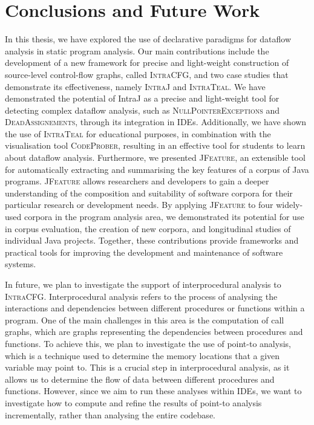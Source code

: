 \section{Conclusions and Future Work}%
\label{sec:kappa:conclusions}%
In this thesis, we have explored the use of declarative paradigms for
dataflow analysis in static program analysis. Our main contributions include the
development of a new framework for precise and light-weight construction of source-level
control-flow graphs, called \textsc{IntraCFG}, and two case studies that demonstrate
its effectiveness, namely \textsc{IntraJ} and \textsc{IntraTeal}.
We have demonstrated the potential of IntraJ as a precise and light-weight tool
for detecting complex dataflow analysis, such as \textsc{NullPointerExceptions} and \textsc{DeadAssignements},
through its integration in IDEs. Additionally, we have shown the use of \textsc{IntraTeal}
for educational purposes, in combination with the visualisation tool \textsc{CodeProber},
resulting in an effective tool for students to learn about dataflow analysis.
Furthermore, we presented  \textsc{JFeature}, an extensible tool for automatically
extracting and summarising the key features of a corpus of Java programs.
\textsc{JFeature} allows researchers and developers to gain a deeper understanding of the composition and
suitability of software corpora for their particular research or development needs.
By applying \textsc{JFeature} to four widely-used corpora in the program analysis area,
we demonstrated its potential for use in corpus evaluation, the creation of new
corpora, and longitudinal studies of individual Java projects.
Together, these contributions provide frameworks and practical tools
for improving the development and maintenance of software systems.


In future, we plan to investigate the support of interprocedural analysis
to \textsc{IntraCFG}. Interprocedural analysis refers to the process of analysing
the interactions and dependencies between different procedures or functions within a
program. One of the main challenges in this area is the computation of call graphs,
which are graphs representing the dependencies between procedures and functions.
To achieve this, we plan to investigate the use of point-to analysis, which is a
technique used to determine the memory locations that a given variable may point to.
This is a crucial step in interprocedural analysis, as it allows us to determine
the flow of data between different procedures and functions. However, since we aim
to run these analyses within IDEs, we want to investigate how to compute and refine
the results of point-to analysis incrementally, rather than analysing the entire codebase.

